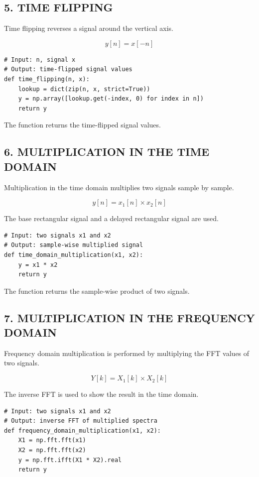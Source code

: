 \documentclass[12pt,a4paper]{article}
\begin{document}
\subsection*{5. TIME FLIPPING}

Time flipping reverses a signal around the vertical axis.

\[
y[n] = x[-n]
\]


\begin{lstlisting}[style=pythoncode]
# Input: n, signal x
# Output: time-flipped signal values
def time_flipping(n, x):
    lookup = dict(zip(n, x, strict=True))
    y = np.array([lookup.get(-index, 0) for index in n])
    return y
\end{lstlisting}

The function returns the time-flipped signal values.

\subsection*{6. MULTIPLICATION IN THE TIME DOMAIN}

Multiplication in the time domain multiplies two signals sample by sample.

\[
y[n] = x_1[n] \times x_2[n]
\]


The base rectangular signal and a delayed rectangular signal are used.

\begin{lstlisting}[style=pythoncode]
# Input: two signals x1 and x2
# Output: sample-wise multiplied signal
def time_domain_multiplication(x1, x2):
    y = x1 * x2
    return y
\end{lstlisting}

The function returns the sample-wise product of two signals.

\subsection*{7. MULTIPLICATION IN THE FREQUENCY DOMAIN}

Frequency domain multiplication is performed by multiplying the FFT values of two signals.

\[
Y[k] = X_1[k] \times X_2[k]
\]


The inverse FFT is used to show the result in the time domain.

\begin{lstlisting}[style=pythoncode]
# Input: two signals x1 and x2
# Output: inverse FFT of multiplied spectra
def frequency_domain_multiplication(x1, x2):
    X1 = np.fft.fft(x1)
    X2 = np.fft.fft(x2)
    y = np.fft.ifft(X1 * X2).real
    return y
\end{lstlisting}
\end{document}
